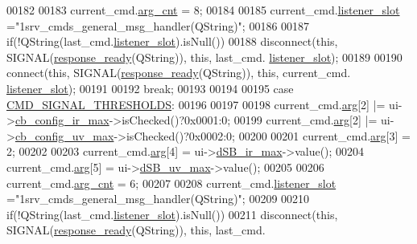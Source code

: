 \begin{DoxyCode}
00182 
00183             current\_cmd.\hyperlink{a00001_affcea772a1bc5362ebbc274b6166f81b}{arg\_cnt}         = 8;
00184 
00185             current\_cmd.\hyperlink{a00001_abb76d8edb39876deb60975c8fd784b3f}{listener\_slot}   =\textcolor{stringliteral}{"1srv\_cmds\_general\_msg\_handler(QString)"};
00186 
00187             \textcolor{keywordflow}{if}(!QString(last\_cmd.\hyperlink{a00001_abb76d8edb39876deb60975c8fd784b3f}{listener\_slot}).isNull())
00188             disconnect(\textcolor{keyword}{this}, SIGNAL(\hyperlink{a00006_a3f6396874778799cf07a7a0149e54977}{response\_ready}(QString)), \textcolor{keyword}{this}, last\_cmd.
      \hyperlink{a00001_abb76d8edb39876deb60975c8fd784b3f}{listener\_slot});
00189 
00190             connect(\textcolor{keyword}{this}, SIGNAL(\hyperlink{a00006_a3f6396874778799cf07a7a0149e54977}{response\_ready}(QString)), \textcolor{keyword}{this}, current\_cmd.
      \hyperlink{a00001_abb76d8edb39876deb60975c8fd784b3f}{listener\_slot});
00191 
00192         \textcolor{keywordflow}{break};
00193 
00194 
00195     \textcolor{keywordflow}{case} \hyperlink{a00031_ac361dc1b32c1036394be0fd7de1182ca}{CMD\_SIGNAL\_THRESHOLDS}:
00196 
00197 
00198             current\_cmd.\hyperlink{a00001_a56e6c2d7315d0ae60a51e8b140c9cfe4}{arg}[2] |= ui->\hyperlink{a00027_ae78fd3c777d081ab1ec1d0142bec3320}{cb\_config\_ir\_max}->isChecked()?0x0001:0;
00199             current\_cmd.\hyperlink{a00001_a56e6c2d7315d0ae60a51e8b140c9cfe4}{arg}[2] |= ui->\hyperlink{a00027_a13ce5fddc83683d7b8b717f0b9a4e2cf}{cb\_config\_uv\_max}->isChecked()?0x0002:0;
00200 
00201             current\_cmd.\hyperlink{a00001_a56e6c2d7315d0ae60a51e8b140c9cfe4}{arg}[3]  = 2;
00202 
00203             current\_cmd.\hyperlink{a00001_a56e6c2d7315d0ae60a51e8b140c9cfe4}{arg}[4]  = ui->\hyperlink{a00027_a220706f1fd93857145032c897e55d9e3}{dSB\_ir\_max}->value();
00204             current\_cmd.\hyperlink{a00001_a56e6c2d7315d0ae60a51e8b140c9cfe4}{arg}[5]  = ui->\hyperlink{a00027_aa2872ada374dace81c4f1cc41d8e244d}{dSB\_uv\_max}->value();
00205 
00206             current\_cmd.\hyperlink{a00001_affcea772a1bc5362ebbc274b6166f81b}{arg\_cnt} = 6;
00207 
00208             current\_cmd.\hyperlink{a00001_abb76d8edb39876deb60975c8fd784b3f}{listener\_slot} =\textcolor{stringliteral}{"1srv\_cmds\_general\_msg\_handler(QString)"};
00209 
00210             \textcolor{keywordflow}{if}(!QString(last\_cmd.\hyperlink{a00001_abb76d8edb39876deb60975c8fd784b3f}{listener\_slot}).isNull())
00211             disconnect(\textcolor{keyword}{this}, SIGNAL(\hyperlink{a00006_a3f6396874778799cf07a7a0149e54977}{response\_ready}(QString)), \textcolor{keyword}{this}, last\_cmd.

\end{DoxyCode}
